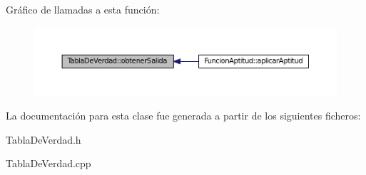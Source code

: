 Gráfico de llamadas a esta función\-:
\nopagebreak
\begin{figure}[H]
\begin{center}
\leavevmode
\includegraphics[width=350pt]{classTablaDeVerdad_a3e53eabc4e37d9514141f4afacc1e915_icgraph}
\end{center}
\end{figure}




La documentación para esta clase fue generada a partir de los siguientes ficheros\-:\begin{DoxyCompactItemize}
\item 
Tabla\-De\-Verdad.\-h\item 
Tabla\-De\-Verdad.\-cpp\end{DoxyCompactItemize}
